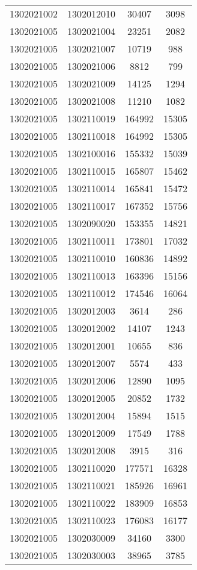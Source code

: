 \begin{longtable}{llcc}
1302021002 & 1302012010 & 30407 & 3098\\
1302021005 & 1302021004 & 23251 & 2082\\
1302021005 & 1302021007 & 10719 & 988\\
1302021005 & 1302021006 & 8812 & 799\\
1302021005 & 1302021009 & 14125 & 1294\\
1302021005 & 1302021008 & 11210 & 1082\\
1302021005 & 1302110019 & 164992 & 15305\\
1302021005 & 1302110018 & 164992 & 15305\\
1302021005 & 1302100016 & 155332 & 15039\\
1302021005 & 1302110015 & 165807 & 15462\\
1302021005 & 1302110014 & 165841 & 15472\\
1302021005 & 1302110017 & 167352 & 15756\\
1302021005 & 1302090020 & 153355 & 14821\\
1302021005 & 1302110011 & 173801 & 17032\\
1302021005 & 1302110010 & 160836 & 14892\\
1302021005 & 1302110013 & 163396 & 15156\\
1302021005 & 1302110012 & 174546 & 16064\\
1302021005 & 1302012003 & 3614 & 286\\
1302021005 & 1302012002 & 14107 & 1243\\
1302021005 & 1302012001 & 10655 & 836\\
1302021005 & 1302012007 & 5574 & 433\\
1302021005 & 1302012006 & 12890 & 1095\\
1302021005 & 1302012005 & 20852 & 1732\\
1302021005 & 1302012004 & 15894 & 1515\\
1302021005 & 1302012009 & 17549 & 1788\\
1302021005 & 1302012008 & 3915 & 316\\
1302021005 & 1302110020 & 177571 & 16328\\
1302021005 & 1302110021 & 185926 & 16961\\
1302021005 & 1302110022 & 183909 & 16853\\
1302021005 & 1302110023 & 176083 & 16177\\
1302021005 & 1302030009 & 34160 & 3300\\
1302021005 & 1302030003 & 38965 & 3785\\

\end{longtable}

